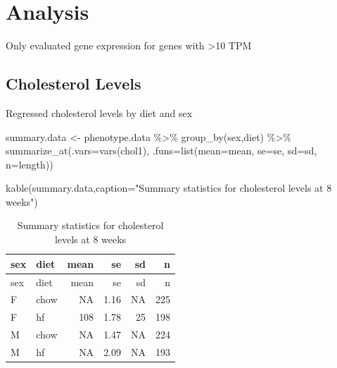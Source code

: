 \documentclass[
]{article}
\newenvironment{Shaded}{\begin{snugshade}}{\end{snugshade}}
\newcommand{\AttributeTok}[1]{\textcolor[rgb]{0.77,0.63,0.00}{#1}}
\newcommand{\FunctionTok}[1]{\textcolor[rgb]{0.00,0.00,0.00}{#1}}
\newcommand{\NormalTok}[1]{#1}
\newcommand{\OtherTok}[1]{\textcolor[rgb]{0.56,0.35,0.01}{#1}}
\newcommand{\SpecialCharTok}[1]{\textcolor[rgb]{0.00,0.00,0.00}{#1}}
\newcommand{\StringTok}[1]{\textcolor[rgb]{0.31,0.60,0.02}{#1}}
\begin{document}
\hypertarget{analysis}{%
\section{Analysis}\label{analysis}}

Only evaluated gene expression for genes with \textgreater10 TPM

\hypertarget{cholesterol-levels}{%
\subsection{Cholesterol Levels}\label{cholesterol-levels}}

Regressed cholesterol levels by diet and sex

\begin{Shaded}
\begin{Highlighting}[]
\NormalTok{summary.data }\OtherTok{\textless{}{-}}
\NormalTok{  phenotype.data }\SpecialCharTok{\%\textgreater{}\%}
  \FunctionTok{group\_by}\NormalTok{(sex,diet) }\SpecialCharTok{\%\textgreater{}\%}
  \FunctionTok{summarize\_at}\NormalTok{(}\AttributeTok{.vars=}\FunctionTok{vars}\NormalTok{(chol1), }\AttributeTok{.funs=}\FunctionTok{list}\NormalTok{(}\AttributeTok{mean=}\NormalTok{mean,}
                                             \AttributeTok{se=}\NormalTok{se,}
                                             \AttributeTok{sd=}\NormalTok{sd,}
                                             \AttributeTok{n=}\NormalTok{length))}

\FunctionTok{kable}\NormalTok{(summary.data,}\AttributeTok{caption=}\StringTok{"Summary statistics for cholesterol levels at 8 weeks"}\NormalTok{)}
\end{Highlighting}
\end{Shaded}

\begin{longtable}[]{@{}llrrrr@{}}
\caption{Summary statistics for cholesterol levels at 8
weeks}\tabularnewline
\toprule()
sex & diet & mean & se & sd & n \\
\midrule()
\endfirsthead
\toprule()
sex & diet & mean & se & sd & n \\
\midrule()
\endhead
F & chow & NA & 1.16 & NA & 225 \\
F & hf & 108 & 1.78 & 25 & 198 \\
M & chow & NA & 1.47 & NA & 224 \\
M & hf & NA & 2.09 & NA & 193 \\
\bottomrule()
\end{longtable}
\end{document}
